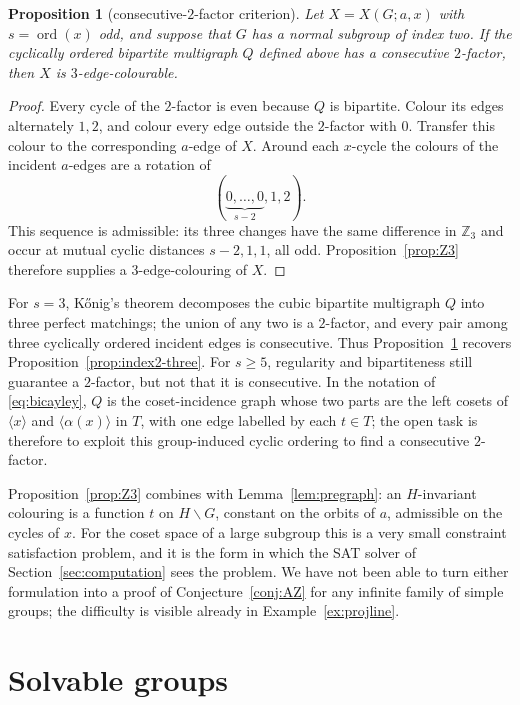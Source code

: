 \documentclass[11pt,a4paper]{article}
\newtheorem{proposition}[theorem]{Proposition}
\theoremstyle{definition}
\theoremstyle{remark}
\newcommand{\ord}{\operatorname{ord}}
\newcommand{\ZZ}{\mathbb{Z}}
\newcommand{\X}[3]{X(#1;#2,#3)}
\begin{document}
\begin{proposition}[consecutive-$2$-factor criterion]\label{prop:consecutive}
Let $X=\X{G}{a}{x}$ with $s=\ord(x)$ odd, and suppose that $G$ has a normal subgroup of index two.  If the cyclically ordered bipartite multigraph $Q$ defined above has a consecutive $2$-factor, then $X$ is $3$-edge-colourable.
\end{proposition}
\begin{proof}
Every cycle of the $2$-factor is even because $Q$ is bipartite.  Colour its edges alternately $1,2$, and colour every edge outside the $2$-factor with $0$.  Transfer this colour to the corresponding $a$-edge of $X$.  Around each $x$-cycle the colours of the incident $a$-edges are a rotation of
\[
  (\underbrace{0,\ldots,0}_{s-2},1,2).
\]
This sequence is admissible: its three changes have the same difference in $\ZZ_3$ and occur at mutual cyclic distances $s-2,1,1$, all odd.  Proposition~\ref{prop:Z3} therefore supplies a $3$-edge-colouring of $X$.
\end{proof}

For $s=3$, K\H{o}nig's theorem decomposes the cubic bipartite multigraph $Q$ into three perfect matchings; the union of any two is a $2$-factor, and every pair among three cyclically ordered incident edges is consecutive.  Thus Proposition~\ref{prop:consecutive} recovers Proposition~\ref{prop:index2-three}.  For $s\ge5$, regularity and bipartiteness still guarantee a $2$-factor, but not that it is consecutive.  In the notation of \eqref{eq:bicayley}, $Q$ is the coset-incidence graph whose two parts are the left cosets of $\langle x\rangle$ and $\langle\alpha(x)\rangle$ in $T$, with one edge labelled by each $t\in T$; the open task is therefore to exploit this group-induced cyclic ordering to find a consecutive $2$-factor.

Proposition~\ref{prop:Z3} combines with Lemma~\ref{lem:pregraph}: an $H$-invariant colouring is a function $t$ on $H\backslash G$, constant on the orbits of $a$, admissible on the cycles of $x$.  For the coset space of a large subgroup this is a very small constraint satisfaction problem, and it is the form in which the SAT solver of Section~\ref{sec:computation} sees the problem.  We have not been able to turn either formulation into a proof of Conjecture~\ref{conj:AZ} for any infinite family of simple groups; the difficulty is visible already in Example~\ref{ex:projline}.

\section{Solvable groups}\label{sec:solvable}
\end{document}
